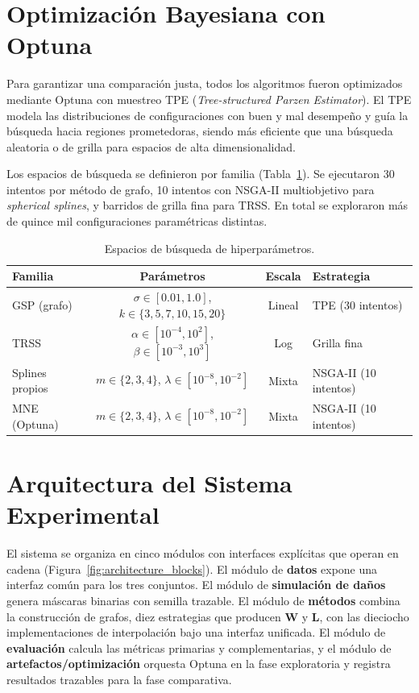 \section{Optimización Bayesiana con Optuna}
\label{sec:optuna}

Para garantizar una comparación justa, todos los algoritmos fueron optimizados mediante Optuna \cite{akiba2019optuna} con muestreo TPE (\textit{Tree-structured Parzen Estimator}). El TPE modela las distribuciones de configuraciones con buen y mal desempeño y guía la búsqueda hacia regiones prometedoras, siendo más eficiente que una búsqueda aleatoria o de grilla para espacios de alta dimensionalidad.

Los espacios de búsqueda se definieron por familia (Tabla~\ref{tab:hyperparams}). Se ejecutaron 30 intentos por método de grafo, 10 intentos con NSGA-II multiobjetivo para \textit{spherical splines}, y barridos de grilla fina para TRSS. En total se exploraron más de quince mil configuraciones paramétricas distintas.

\begin{table}[htbp]
\centering
\caption{Espacios de búsqueda de hiperparámetros.}
\label{tab:hyperparams}
\small
\begin{tabular}{@{}l c c l@{}}
\toprule
Familia & Parámetros & Escala & Estrategia \\
\midrule
GSP (grafo) & $\sigma \in [0.01, 1.0]$, $k \in \{3,5,7,10,15,20\}$ & Lineal & TPE (30 intentos) \\
TRSS & $\alpha \in [10^{-4}, 10^2]$, $\beta \in [10^{-3}, 10^3]$ & Log & Grilla fina \\
Splines propios & $m \in \{2,3,4\}$, $\lambda \in [10^{-8}, 10^{-2}]$ & Mixta & NSGA-II (10 intentos) \\
MNE (Optuna) & $m \in \{2,3,4\}$, $\lambda \in [10^{-8}, 10^{-2}]$ & Mixta & NSGA-II (10 intentos) \\
\bottomrule
\end{tabular}
\end{table}

\section{Arquitectura del Sistema Experimental}
\label{sec:architecture}

El sistema se organiza en cinco módulos con interfaces explícitas que operan en cadena (Figura~\ref{fig:architecture_blocks}). El módulo de \textbf{datos} expone una interfaz común para los tres conjuntos. El módulo de \textbf{simulación de daños} genera máscaras binarias con semilla trazable. El módulo de \textbf{métodos} combina la construcción de grafos, diez estrategias que producen $\mathbf{W}$ y $\mathbf{L}$, con las dieciocho implementaciones de interpolación bajo una interfaz unificada. El módulo de \textbf{evaluación} calcula las métricas primarias y complementarias, y el módulo de \textbf{artefactos/optimización} orquesta Optuna en la fase exploratoria y registra resultados trazables para la fase comparativa.

